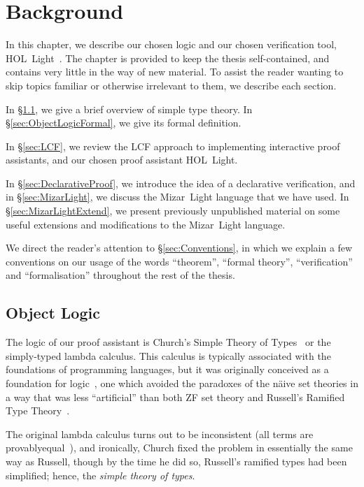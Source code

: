 \chapter{Background}\label{chapter:Background}
In this chapter, we describe our chosen logic and our chosen verification tool, \linebreak HOL~Light~\cite{HOLLight}. The chapter is provided to keep the thesis self-contained, and contains very little in the way of new material. To assist the reader wanting to skip topics familiar or otherwise irrelevant to them, we describe each section.

In \S\ref{sec:ObjectLogic}, we give a brief overview of simple type theory. In \S\ref{sec:ObjectLogicFormal}, we give its formal definition.

In \S\ref{sec:LCF}, we review the LCF approach to implementing interactive proof assistants, and our chosen proof assistant HOL~Light.

In \S\ref{sec:DeclarativeProof}, we introduce the idea of a declarative verification, and in \S\ref{sec:MizarLight}, we discuss the Mizar~Light language that we have used. In \S\ref{sec:MizarLightExtend}, we present previously unpublished material on some useful extensions and modifications to the Mizar~Light language.

We direct the reader's attention to \S\ref{sec:Conventions}, in which we explain a few conventions on our usage of the words ``theorem'', ``formal theory'', ``verification'' and ``formalisation'' throughout the rest of the thesis.

\section{Object Logic}\label{sec:ObjectLogic}
The logic of our proof assistant is Church's Simple Theory of Types~\cite{ChurchTheoryOfTypes} or the simply-typed lambda calculus. This calculus is typically associated with the foundations of programming languages, but it was originally conceived as a foundation for logic~\cite{UntypedTheoryLambdaCalculus}, one which avoided the paradoxes of the n\"{a}ive set theories in a way that was less ``artificial'' than both ZF set theory and Russell's Ramified Type Theory~\cite{RussellTheoryOfTypes}.

The original lambda calculus turns out to be inconsistent (all terms are provably\linebreak equal~\cite{InconsistencyLambdaCalculus}), and ironically, Church fixed the problem in essentially the same way as Russell, though by the time he did so, Russell's ramified types had been simplified; hence, the \emph{simple theory of types}.

